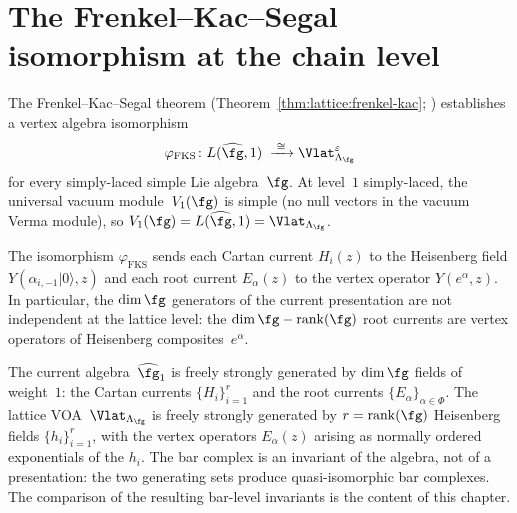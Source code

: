 
\section{The Frenkel--Kac--Segal isomorphism at the chain level}%
\label{sec:level1-fks}

The Frenkel--Kac--Segal theorem
(Theorem~\ref{thm:lattice:frenkel-kac}; \cite{FK80,Se81})
establishes a vertex algebra isomorphism
\begin{equation}\label{eq:level1-fks}
\varphi_{\mathrm{FKS}} \colon
L(\widehat{\fg}, 1)
\;\xrightarrow{\;\cong\;}
\Vlat_{\Lambda_\fg}^{\varepsilon}
\end{equation}
for every simply-laced simple Lie algebra~$\fg$. At level~$1$
simply-laced, the universal vacuum module~$V_1(\fg)$ is simple
(no null vectors in the vacuum Verma module), so
$V_1(\fg) = L(\widehat{\fg}, 1) = \Vlat_{\Lambda_\fg}$.

The isomorphism $\varphi_{\mathrm{FKS}}$ sends
each Cartan current $H_i(z)$ to the Heisenberg field
$Y(\alpha_{i,-1}|0\rangle, z)$
and each root current $E_\alpha(z)$ to the vertex
operator $Y(e^\alpha, z)$. In particular, the
$\dim\fg$ generators of the current presentation are not
independent at the lattice level: the $\dim\fg - \operatorname{rank}(\fg)$
root currents are vertex operators of Heisenberg
composites~$e^\alpha$.

\begin{remark}%
\label{rem:level1-two-presentations}
The current algebra~$\widehat{\fg}_1$ is freely strongly
generated by $\dim\fg$ fields of weight~$1$: the Cartan
currents $\{H_i\}_{i=1}^r$ and the root
currents $\{E_\alpha\}_{\alpha \in \Phi}$.
The lattice VOA~$\Vlat_{\Lambda_\fg}$ is freely strongly
generated by $r = \operatorname{rank}(\fg)$ Heisenberg fields
$\{h_i\}_{i=1}^r$, with the vertex operators $E_\alpha(z)$
arising as normally ordered exponentials of the $h_i$.
The bar complex is an invariant of the algebra, not of a
presentation: the two generating sets produce
quasi-isomorphic bar complexes. The comparison of the
resulting bar-level invariants is the content of this chapter.
\end{remark}



